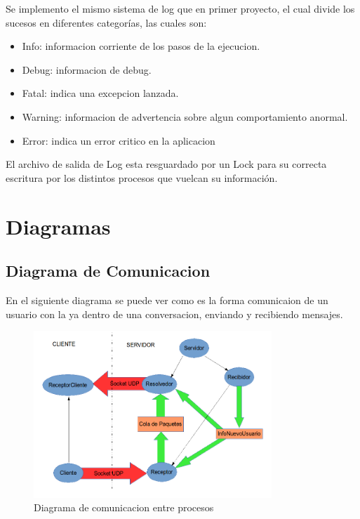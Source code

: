 \documentclass[a4paper,12pt,titlepage]{article}
\begin{document}
Se implemento el mismo sistema de log que en primer proyecto, el cual divide los sucesos en diferentes categorías, las cuales son:
\begin{itemize}
\item Info: informacion corriente de los pasos de la ejecucion.
\item Debug: informacion de debug.
\item Fatal: indica una excepcion lanzada.
\item Warning: informacion de advertencia sobre algun comportamiento anormal.
\item Error: indica un error critico en la aplicacion
\end{itemize}
El archivo de salida de Log esta resguardado por un Lock para su correcta escritura por los distintos procesos que vuelcan su información.

\newpage
\section{Diagramas}
\subsection{Diagrama de Comunicacion}
En el siguiente diagrama se puede ver como es la forma comunicaion de un usuario con la ya dentro de una conversacion, enviando y recibiendo mensajes.
\begin{figure}[h!]
\centering
\includegraphics[width=0.8\textwidth]{dia_comunicacion.png}
\caption{Diagrama de comunicacion entre procesos}
\label{fig:comunicacion}
\end{figure}

\newpage
\end{document}
